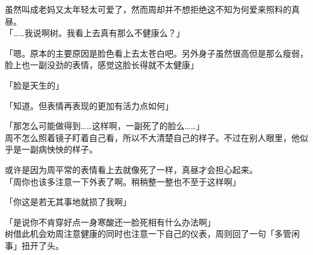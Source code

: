 虽然叫成老妈又太年轻太可爱了，然而周却并不想拒绝这不知为何爱来照料的真昼。\\

「……我说啊树。我看上去真有那么不健康么？」

「嗯。原本的主要原因是脸色看上去太苍白吧。另外身子虽然很高但是那么瘦弱，脸上也一副没劲的表情，感觉这脸长得就不太健康」

「脸是天生的」

「知道。但表情再表现的更加有活力点如何」

「那怎么可能做得到……这样啊，一副死了的脸么……」\\

周不怎么照着镜子盯着自己看，所以不大清楚自己的样子。不过在别人眼里，他似乎是一副病怏怏的样子。

或许是因为周平常的表情看上去就像死了一样，真昼才会担心起来。\\

「周你也该多注意一下外表了啊。稍稍整一整也不至于这样啊」

「你这是若无其事地就损了我啊」

「是说你不肯穿好点一身寒酸还一脸死相有什么办法啊」\\

树借此机会劝周注意健康的同时也注意一下自己的仪表，周则回了一句「多管闲事」扭开了头。
